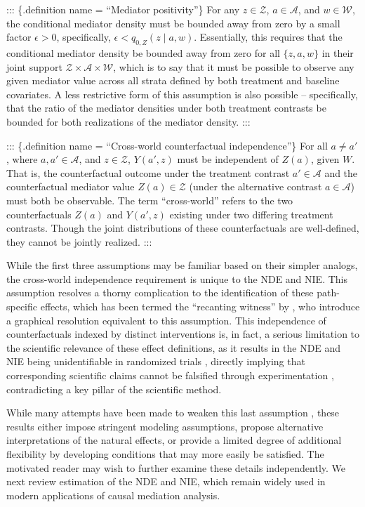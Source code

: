 \documentclass[
  12pt, krantz2,
]{krantz}
\newcommand{\1}{\mathbbm{1}}
\theoremstyle{definition}
\theoremstyle{definition}
\theoremstyle{definition}
\theoremstyle{definition}
\theoremstyle{remark}
\begin{document}
::: \{.definition name = ``Mediator positivity''\}
For any \(z \in \mathcal{Z}\), \(a \in \mathcal{A}\), and \(w \in \mathcal{W}\), the
conditional mediator density must be bounded away from zero by a small factor
\(\epsilon > 0\), specifically, \(\epsilon < q_{0,Z}(z \mid a, w)\). Essentially,
this requires that the conditional mediator density be bounded away from zero
for all \(\{z, a, w\}\) in their joint support \(\mathcal{Z} \times \mathcal{A} \times \mathcal{W}\), which is to say that it must be possible to observe any
given mediator value across all strata defined by both treatment and baseline
covariates. A less restrictive form of this assumption is also possible --
specifically, that the ratio of the mediator densities under both treatment
contrasts be bounded for both realizations of the mediator density.
:::

::: \{.definition name = ``Cross-world counterfactual independence''\}
For all \(a \neq a'\), where \(a, a' \in \mathcal{A}\), and \(z \in \mathcal{Z}\),
\(Y(a', z)\) must be independent of \(Z(a)\), given \(W\). That is, the counterfactual
outcome under the treatment contrast \(a' \in \mathcal{A}\) and the counterfactual
mediator value \(Z(a) \in \mathcal{Z}\) (under the alternative contrast \(a \in \mathcal{A}\)) must both be observable. The term ``cross-world'' refers to the two
counterfactuals \(Z(a)\) and \(Y(a', z)\) existing under two differing treatment
contrasts. Though the joint distributions of these counterfactuals are
well-defined, they cannot be jointly realized.
:::

While the first three assumptions may be familiar based on their simpler
analogs, the cross-world independence requirement is unique to the NDE and NIE.
This assumption resolves a thorny complication to the identification of these
path-specific effects, which has been termed the ``recanting witness'' by
\citet{avin2005identifiability}, who introduce a graphical resolution equivalent to
this assumption. This independence of counterfactuals indexed by distinct
interventions is, in fact, a serious limitation to the scientific relevance of
these effect definitions, as it results in the NDE and NIE being unidentifiable
in randomized trials \citep{robins2010alternative}, directly implying that
corresponding scientific claims cannot be falsified through experimentation
\citep{popper1934logic, dawid2000causal}, contradicting a key pillar of the
scientific method.

While many attempts have been made to weaken this last assumption
\citep{petersen2006estimation, imai2010identification, vansteelandt2012imputation, vansteelandt2012natural}, these results either impose stringent modeling
assumptions, propose alternative interpretations of the natural effects, or
provide a limited degree of additional flexibility by developing conditions
that may more easily be satisfied. The motivated reader may wish to further
examine these details independently. We next review estimation of the NDE and
NIE, which remain widely used in modern applications of causal mediation
analysis.
\end{document}
